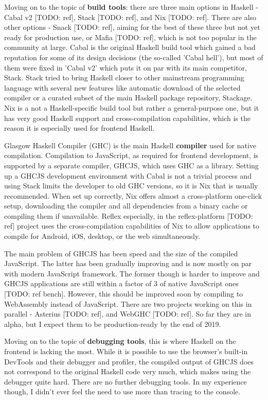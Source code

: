 \documentclass[english,odsaz]{fitthesis}
\begin{document}
Moving on to the topic of \textbf{build tools}: there are three main options in Haskell -
Cabal v2 [TODO: ref], Stack [TODO: ref], and Nix [TODO: ref]. There are also
other options - Snack [TODO: ref], aiming for the best of these three but not
yet ready for production use, or Mafia [TODO: ref], which is not too popular in
the community at large. Cabal is the original Haskell build tool which gained a
bad reputation for some of its design decisions (the so-called 'Cabal hell'),
but most of them were fixed in 'Cabal v2' which puts it on par with its main
competitor, Stack. Stack tried to bring Haskell closer to other mainstream
programming language with several new features like automatic download of the
selected compiler or a curated subset of the main Haskell package repository,
Stackage. Nix is a not a Haskell-specific build tool but rather a
general-purpose one, but it has very good Haskell support and cross-compilation
capabilities, which is the reason it is especially used for frontend Haskell.

Glasgow Haskell Compiler (GHC) is the main Haskell \textbf{compiler} used for native
compilation. Compilation to JavaScript, as required for frontend development, is
supported by a separate compiler, GHCJS, which uses GHC as a library. Setting up
a GHCJS development environment with Cabal is not a trivial process and using
Stack limits the developer to old GHC versions, so it is Nix that is usually
recommended. When set up correctly, Nix offers almost a cross-platform one-click
setup, downloading the compiler and all dependencies from a binary cache or
compiling them if unavailable. Reflex especially, in the reflex-platform [TODO:
ref] project uses the cross-compilation capabilities of Nix to allow
applications to compile for Android, iOS, desktop, or the web simultaneously.

The main problem of GHCJS has been speed and the size of the compiled
JavaScript. The latter has been gradually improving and is now mostly on par
with modern JavaScript framework. The former though is harder to improve and
GHCJS applications are still within a factor of 3 of native JavaScript ones
[TODO: ref bench]. However, this should be improved soon by compiling to
WebAssembly instead of JavaScript. There are two projects working on this in
parallel - Asterius [TODO: ref], and WebGHC [TODO: ref]. So far they are in
alpha, but I expect them to be production-ready by the end of 2019.

Moving on to the topic of \textbf{debugging tools}, this is where Haskell on the frontend
is lacking the most. While it is possible to use the browser's built-in DevTools
and their debugger and profiler, the compiled output of GHCJS does not
correspond to the original Haskell code very much, which makes using the
debugger quite hard. There are no further debugging tools. In my experience
though, I didn't ever feel the need to use more than tracing to the console.
\end{document}
